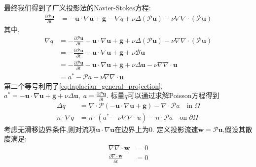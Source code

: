 \documentclass[12pt,halfline,a4paper]{ouparticle}
\begin{document}
最终我们得到了广义投影法的Navier-Stokes方程:
\begin{equation}
    \begin{aligned}
        \frac{\partial \mathcal{P}\boldsymbol{u} }{\partial t}&= -\boldsymbol{u} \cdot \nabla \boldsymbol{u}  + \mathbf{g}  - \nabla q + \nu \Delta (\mathcal{P}\boldsymbol{u}) - \nu \nabla\nabla\cdot(\mathcal{P}\boldsymbol{u})
    \end{aligned}
\end{equation}
其中,
\begin{equation}
    \begin{aligned}
        \nabla q &= - \frac{\partial \mathcal{P}\boldsymbol{u} }{\partial t} -\boldsymbol{u} \cdot \nabla \boldsymbol{u}  + \mathbf{g} + \nu \Delta (\mathcal{P}\boldsymbol{u}) - \nu \nabla\nabla\cdot(\mathcal{P}\boldsymbol{u}) \\
            &= - \frac{\partial \mathcal{P}\boldsymbol{u} }{\partial t}  -\boldsymbol{u} \cdot \nabla \boldsymbol{u}  + \mathbf{g} + \nu\mathcal{B}\boldsymbol{u}\\
            &=- \frac{\partial \mathcal{P}\boldsymbol{u} }{\partial t}  -\boldsymbol{u} \cdot \nabla \boldsymbol{u}  + \mathbf{g} + \nu\Delta \boldsymbol{u} - \nu \nabla\nabla\cdot\boldsymbol{u}\\
            &=a^* - \mathcal{P}a - \nu \nabla\nabla\cdot\boldsymbol{u}
        \end{aligned}
\end{equation}
第二个等号利用了\eqref{eq:laplacian_general_projection},$a^* = -\boldsymbol{u} \cdot \nabla \boldsymbol{u}  + \mathbf{g} + \nu\Delta \boldsymbol{u},\; a = \frac{\partial \mathcal{P}\boldsymbol{u} }{\partial t}$.
\newline
标量$q$可以通过求解Poisson方程得到
\begin{equation}
    \begin{aligned}
        \Delta q &= \nabla \cdot \mathcal{P}(-\boldsymbol{u}\cdot\nabla\boldsymbol{u} + \mathbf{g}) -\nabla \cdot \mathcal{P}a\quad \text{in} \; \Omega\\
        n \cdot \nabla q &=  n \cdot (a^*-\nu\nabla\nabla\cdot u)  -n \cdot \mathcal{P}a\quad \text{on} \; \partial \Omega
    \end{aligned}
\end{equation}
考虑无滑移边界条件,则对流项$\boldsymbol{u} \cdot \nabla \boldsymbol{u}$在边界上为0.
\newline
定义投影流速$\boldsymbol{w} = \mathcal{P}\boldsymbol{u}$,假设其散度满足:
\begin{equation}
    \begin{aligned}
        \nabla\nabla \cdot \boldsymbol{w} &= 0\\
        \frac{\partial \nabla \cdot \boldsymbol{w} }{\partial t} &= 0
    \end{aligned}
\end{equation}
\end{document}
